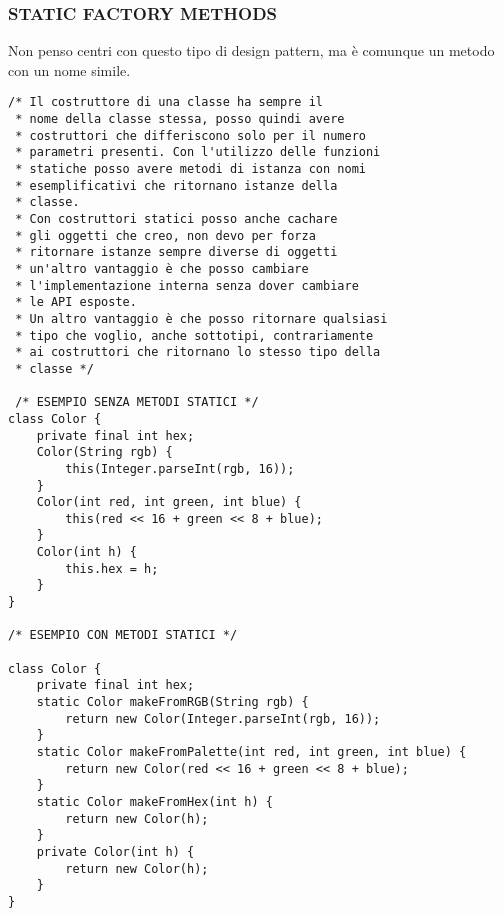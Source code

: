 \subsubsection{STATIC FACTORY METHODS}
\noindent Non penso centri con questo tipo di design pattern, ma è comunque un metodo con un nome simile.
\begin{lstlisting}
/* Il costruttore di una classe ha sempre il 
 * nome della classe stessa, posso quindi avere
 * costruttori che differiscono solo per il numero
 * parametri presenti. Con l'utilizzo delle funzioni 
 * statiche posso avere metodi di istanza con nomi 
 * esemplificativi che ritornano istanze della 
 * classe. 
 * Con costruttori statici posso anche cachare 
 * gli oggetti che creo, non devo per forza
 * ritornare istanze sempre diverse di oggetti
 * un'altro vantaggio è che posso cambiare 
 * l'implementazione interna senza dover cambiare
 * le API esposte. 
 * Un altro vantaggio è che posso ritornare qualsiasi
 * tipo che voglio, anche sottotipi, contrariamente
 * ai costruttori che ritornano lo stesso tipo della
 * classe */
 
 /* ESEMPIO SENZA METODI STATICI */
class Color {
    private final int hex;
    Color(String rgb) {
        this(Integer.parseInt(rgb, 16));
    }
    Color(int red, int green, int blue) {
        this(red << 16 + green << 8 + blue);
    }
    Color(int h) {
        this.hex = h;
    }
}

/* ESEMPIO CON METODI STATICI */

class Color {
    private final int hex;
    static Color makeFromRGB(String rgb) {
        return new Color(Integer.parseInt(rgb, 16));
    }
    static Color makeFromPalette(int red, int green, int blue) {
        return new Color(red << 16 + green << 8 + blue);
    }
    static Color makeFromHex(int h) {
        return new Color(h);
    }
    private Color(int h) {
        return new Color(h);
    }
} 

\end{lstlisting}

